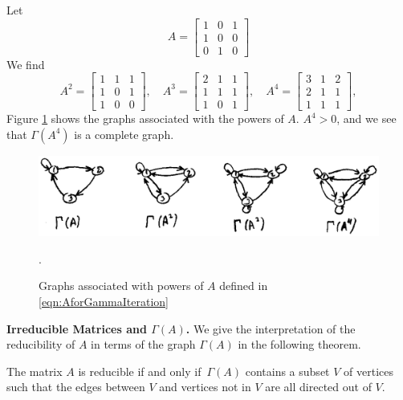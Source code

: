 \begin{xexample}
Let
\begin{equation}
  A = \begin{bmatrix}
           1 & 0 & 1 \\ 1 & 0 & 0 \\ 0 & 1 & 0
      \end{bmatrix}
\label{eqn:AforGammaIteration}
\end{equation}
We find
\begin{equation}
   A^2 = \begin{bmatrix}
            1 & 1 & 1 \\ 1 & 0 & 1 \\ 1 & 0 & 0
         \end{bmatrix},
   \quad
   A^3 = \begin{bmatrix}
            2 & 1 & 1 \\ 1 & 1 & 1 \\ 1 & 0 & 1
         \end{bmatrix},
   \quad
   A^4 = \begin{bmatrix}
            3 & 1 & 2 \\ 2 & 1 & 1 \\ 1 & 1 & 1
         \end{bmatrix},
\end{equation}
Figure \ref{fig:GammaIteration} shows the graphs associated
with the powers of $A$.  $A^4 > 0$, and we see that
$\Gamma(A^4)$ is a complete graph.
\end{xexample}

\begin{figure}
\centerline{\includegraphics[width=4.5in]{images/GammaIteration.ps}}
\caption{Graphs associated with powers of $A$ defined in \eqref{eqn:AforGammaIteration}}.
\label{fig:GammaIteration}
\end{figure}

\medskip
\noindent
\textbf{Irreducible Matrices and $\Gamma(A)$.}
We give the interpretation of the reducibility of $A$ in terms of the graph $\Gamma(A)$
in the following theorem.

\begin{theorem}
The matrix $A$ is reducible if and only if $\,\Gamma(A)$ contains a subset
$V$ of vertices such that the
edges between $V$ and vertices not in $V$
are all directed out of $V$.
\end{theorem}

